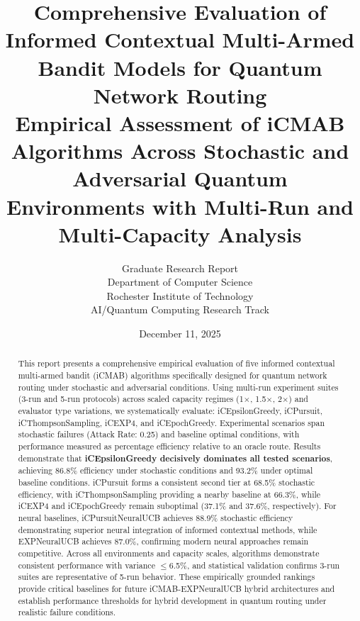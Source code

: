 \documentclass[12pt,a4paper]{article}
\title{\textbf{Comprehensive Evaluation of Informed Contextual Multi-Armed Bandit Models for Quantum Network Routing}\\
\large{Empirical Assessment of iCMAB Algorithms Across Stochastic and Adversarial Quantum Environments with Multi-Run and Multi-Capacity Analysis}}
\author{Graduate Research Report\\
Department of Computer Science\\
Rochester Institute of Technology\\
AI/Quantum Computing Research Track}
\date{December 11, 2025}
\newcommand{\primarytext}[1]{\textcolor{primaryblue}{\textbf{#1}}}
\begin{document}
\maketitle

\begin{abstract}
This report presents a comprehensive empirical evaluation of five informed contextual multi-armed bandit (iCMAB) algorithms specifically designed for quantum network routing under stochastic and adversarial conditions. Using multi-run experiment suites (3-run and 5-run protocols) across scaled capacity regimes (1$\times$, 1.5$\times$, 2$\times$) and evaluator type variations, we systematically evaluate: iCEpsilonGreedy, iCPursuit, iCThompsonSampling, iCEXP4, and iCEpochGreedy. Experimental scenarios span stochastic failures (Attack Rate: 0.25) and baseline optimal conditions, with performance measured as percentage efficiency relative to an oracle route. Results demonstrate that \primarytext{iCEpsilonGreedy decisively dominates all tested scenarios}, achieving 86.8\% efficiency under stochastic conditions and 93.2\% under optimal baseline conditions. iCPursuit forms a consistent second tier at 68.5\% stochastic efficiency, with iCThompsonSampling providing a nearby baseline at 66.3\%, while iCEXP4 and iCEpochGreedy remain suboptimal (37.1\% and 37.6\%, respectively). For neural baselines, iCPursuitNeuralUCB achieves 88.9\% stochastic efficiency demonstrating superior neural integration of informed contextual methods, while EXPNeuralUCB achieves 87.0\%, confirming modern neural approaches remain competitive. Across all environments and capacity scales, algorithms demonstrate consistent performance with variance $\leq$6.5\%, and statistical validation confirms 3-run suites are representative of 5-run behavior. These empirically grounded rankings provide critical baselines for future iCMAB-EXPNeuralUCB hybrid architectures and establish performance thresholds for hybrid development in quantum routing under realistic failure conditions.
\end{abstract}

\newpage
\tableofcontents

\newpage
\end{document}
